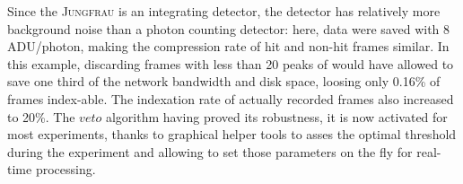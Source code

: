 \documentclass[preprint]{iucr}              %
\begin{document}

Since the \textsc{Jungfrau} is an integrating detector, the detector has relatively more background noise than a photon counting detector: here, data were saved with 8 ADU/photon, making the compression rate of hit and non-hit frames similar.
In this example, discarding frames with less than 20 peaks of would have allowed to save one third of the network bandwidth and disk space, loosing only 0.16\% of frames index-able. 
The indexation rate of actually recorded frames also increased to 20\%.
The $veto$ algorithm having proved its robustness, it is now activated for most experiments, thanks to graphical helper tools to asses the optimal threshold during the experiment and allowing to set those parameters on the fly for real-time processing.
\end{document}
